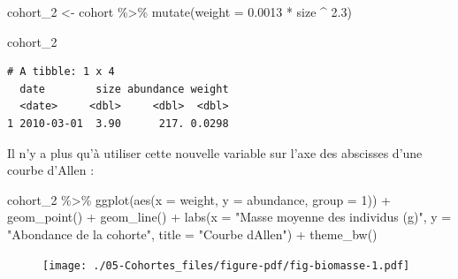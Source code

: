 \documentclass[
  a4paper,
  DIV=11,
  numbers=noendperiod,
  oneside]{scrreprt}
\newenvironment{Shaded}{}{}
\newcommand{\AttributeTok}[1]{\textcolor[rgb]{0.84,0.23,0.29}{#1}}
\newcommand{\DecValTok}[1]{\textcolor[rgb]{0.00,0.36,0.77}{#1}}
\newcommand{\FloatTok}[1]{\textcolor[rgb]{0.00,0.36,0.77}{#1}}
\newcommand{\FunctionTok}[1]{\textcolor[rgb]{0.44,0.26,0.76}{#1}}
\newcommand{\NormalTok}[1]{\textcolor[rgb]{0.14,0.16,0.18}{#1}}
\newcommand{\OtherTok}[1]{\textcolor[rgb]{0.44,0.26,0.76}{#1}}
\newcommand{\SpecialCharTok}[1]{\textcolor[rgb]{0.00,0.36,0.77}{#1}}
\newcommand{\StringTok}[1]{\textcolor[rgb]{0.01,0.18,0.38}{#1}}
\begin{document}
\begin{Shaded}
\begin{Highlighting}[]
\NormalTok{cohort\_2 }\OtherTok{\textless{}{-}}\NormalTok{ cohort }\SpecialCharTok{\%\textgreater{}\%}
  \FunctionTok{mutate}\NormalTok{(}\AttributeTok{weight =} \FloatTok{0.0013} \SpecialCharTok{*}\NormalTok{ size }\SpecialCharTok{\^{}} \FloatTok{2.3}\NormalTok{)}

\NormalTok{cohort\_2}
\end{Highlighting}
\end{Shaded}

\begin{verbatim}
# A tibble: 1 x 4
  date        size abundance weight
  <date>     <dbl>     <dbl>  <dbl>
1 2010-03-01  3.90      217. 0.0298
\end{verbatim}

Il n'y a plus qu'à utiliser cette nouvelle variable sur l'axe des
abscisses d'une courbe d'Allen :

\begin{Shaded}
\begin{Highlighting}[]
\NormalTok{cohort\_2 }\SpecialCharTok{\%\textgreater{}\%}
  \FunctionTok{ggplot}\NormalTok{(}\FunctionTok{aes}\NormalTok{(}\AttributeTok{x =}\NormalTok{ weight, }\AttributeTok{y =}\NormalTok{ abundance, }\AttributeTok{group =} \DecValTok{1}\NormalTok{)) }\SpecialCharTok{+}
  \FunctionTok{geom\_point}\NormalTok{() }\SpecialCharTok{+}
  \FunctionTok{geom\_line}\NormalTok{() }\SpecialCharTok{+}
  \FunctionTok{labs}\NormalTok{(}\AttributeTok{x =} \StringTok{"Masse moyenne des individus (g)"}\NormalTok{,}
       \AttributeTok{y =} \StringTok{"Abondance de la cohorte"}\NormalTok{,}
       \AttributeTok{title =} \StringTok{"Courbe d\textquotesingle{}Allen"}\NormalTok{) }\SpecialCharTok{+}
  \FunctionTok{theme\_bw}\NormalTok{()}
\end{Highlighting}
\end{Shaded}

\begin{figure}[H]


{\centering \texttt{[image: ./05-Cohortes\_files/figure-pdf/fig-biomasse-1.pdf]}

}

\end{figure}
\end{document}
